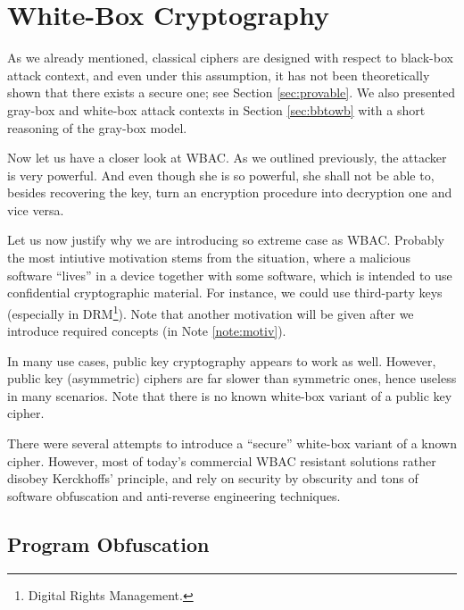 \section{White-Box Cryptography}
\label{sec:wbc}

As we already mentioned, classical ciphers are designed with respect to black-box attack context, and even under this assumption, it has not been theoretically shown that there exists a secure one; see Section \ref{sec:provable}. We also presented gray-box and white-box attack contexts in Section \ref{sec:bbtowb} with a short reasoning of the gray-box model.

Now let us have a closer look at WBAC. As we outlined previously, the attacker is very powerful. And even though she is so powerful, she shall not be able to, besides recovering the key, turn an encryption procedure into decryption one and vice versa.

Let us now justify why we are introducing so extreme case as WBAC. Probably the most intiutive motivation stems from the situation, where a malicious software ``lives'' in a device together with some software, which is intended to use confidential cryptographic material. For instance, we could use third-party keys (especially in DRM\footnote{Digital Rights Management.}). Note that another motivation will be given after we introduce required concepts (in Note \ref{note:motiv}).

In many use cases, public key cryptography appears to work as well. However, public key (asymmetric) ciphers are far slower than symmetric ones, hence useless in many scenarios. Note that there is no known white-box variant of a public key cipher.

There were several attempts to introduce a ``secure'' white-box variant of a known cipher. However, most of today's commercial WBAC resistant solutions rather disobey Kerckhoffs' principle, and rely on security by obscurity and tons of software obfuscation and anti-reverse engineering techniques.




\subsection{Program Obfuscation}
\label{sec:impos}

